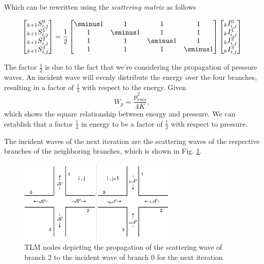 \documentclass[twocolumn]{article}
\begin{document}
Which can be rewritten using the \textit{scattering matrix} as follows

\begin{equation}
\begin{bmatrix}
    _{k+1}S_{i,j}^{0} \\
    _{k+1}S_{i,j}^{1} \\
    _{k+1}S_{i,j}^{2} \\
    _{k+1}S_{i,j}^{3} \\
\end{bmatrix}
=
\frac{1}{2}
\begin{bmatrix}
    \sminus1 & 1 & 1 & 1 \\
    1 & \sminus1 & 1 & 1 \\
    1 & 1 & \sminus1 & 1 \\
    1 & 1 & 1 & \sminus1 \\
\end{bmatrix}
\begin{bmatrix}
    _kI_{i,j}^{0} \\
    _kI_{i,j}^{1} \\
    _kI_{i,j}^{2} \\
    _kI_{i,j}^{3} \\
\end{bmatrix}
\label{eq_scattering_matrix}
\end{equation}

The factor $\frac{1}{2}$ is due to the fact that we're considering the propagation of pressure waves.
An incident wave will evenly distribute the energy over the four branches, resulting
in a factor of $\frac{1}{4}$ with respect to the energy.
Given
\begin{equation}
    W_p = \frac{p_{rms}^{2}}{4K},
\end{equation}
which shows the square relationship between energy and pressure.
We can establish that a factor $\frac{1}{4}$ in energy to be a factor of $\frac{1}{2}$ with respect to
pressure.


The incident waves of the next iteration are the scattering waves of the respective
branches of the neighboring branches, which is shown in Fig. \ref{fig_tlm_nodes_transmission}.

\begin{figure}[H]
    \centering
    \includegraphics[width=75mm]{./Images/tlm_nodes_transmission.png}
    \caption{TLM nodes depicting the propagation of the scattering wave of branch $2$ to the incident wave of branch $0$ for the next iteration}
    \label{fig_tlm_nodes_transmission}
\end{figure}
\end{document}
